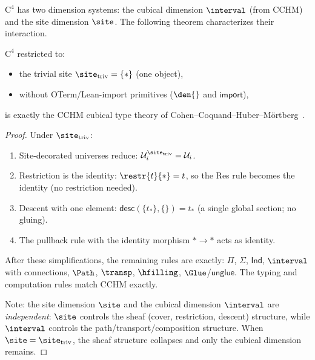 $\mathrm{C}^4$ has two dimension systems: the cubical dimension
$\interval$ (from CCHM) and the site dimension $\site$.  The following
theorem characterizes their interaction.

\begin{theorem}
\label{thm:conservativity-cchm}
$\mathrm{C}^4$ restricted to:
\begin{itemize}
\item the trivial site $\site_\mathrm{triv} = \{\ast\}$ (one object),
\item without OTerm/Lean-import primitives ($\den{}$ and $\mathsf{import}$),
\end{itemize}
is exactly the CCHM cubical type theory of Cohen--Coquand--Huber--Mörtberg~\cite{cohen2018}.
\end{theorem}

\begin{proof}
Under $\site_\mathrm{triv}$:
\begin{enumerate}
\item Site-decorated universes reduce: $\mathcal{U}_i^{\site_\mathrm{triv}} = \mathcal{U}_i$.
\item Restriction is the identity: $\restr{t}{\ast} = t$, so the Res rule
  becomes the identity (no restriction needed).
\item Descent with one element: $\mathsf{desc}(\{t_\ast\},\{\}) = t_\ast$
  (a single global section; no gluing).
\item The pullback rule with the identity morphism $\ast \to \ast$
  acts as identity.
\end{enumerate}
After these simplifications, the remaining rules are exactly:
$\Pi$, $\Sigma$, $\mathsf{Ind}$, $\interval$ with connections,
$\Path$, $\transp$, $\hfilling$, $\Glue$/$\mathsf{unglue}$.
The typing and computation rules match CCHM exactly.

Note: the site dimension $\site$ and the cubical dimension $\interval$
are \emph{independent}: $\site$ controls the sheaf (cover, restriction,
descent) structure, while $\interval$ controls the path/transport/composition
structure.  When $\site = \site_\mathrm{triv}$, the sheaf structure collapses
and only the cubical dimension remains.
\end{proof}

